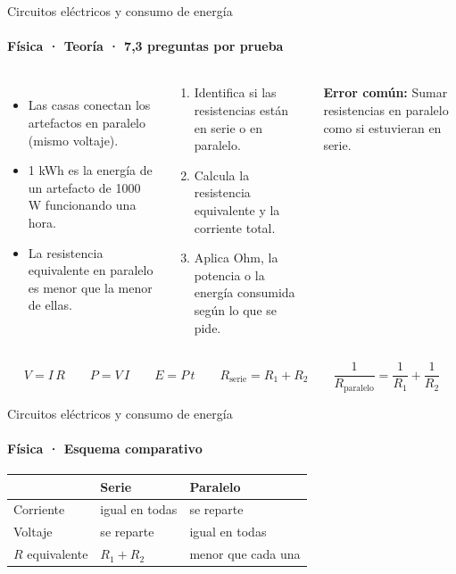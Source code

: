 \documentclass[aspectratio=169,11pt]{beamer}
\newlength{\ajustealto}
\newenvironment{ajustar}[1][0.74\textheight]
  {\setlength{\ajustealto}{#1}\begin{lrbox}{\ajustecaja}\begin{minipage}{\textwidth}}
  {\end{minipage}\end{lrbox}%
   \ifdim\dimexpr\ht\ajustecaja+\dp\ajustecaja\relax>\ajustealto
     \resizebox*{!}{\ajustealto}{\usebox{\ajustecaja}}\else\usebox{\ajustecaja}\fi}
\begin{document}
\begin{frame}{Circuitos eléctricos y consumo de energía}
\label{tema-cs-electricidad}
\framesubtitle{Física · Teoría · 7,3 preguntas por prueba}
\begin{ajustar}
\begin{columns}[T,onlytextwidth]
\begin{itemize}\footnotesize
\item Las casas conectan los artefactos en paralelo (mismo voltaje).
\item 1 kWh es la energía de un artefacto de 1000 W funcionando una hora.
\item La resistencia equivalente en paralelo es menor que la menor de ellas.
\end{itemize}
\begin{cajaregla}\scriptsize \begin{enumerate}\item Identifica si las resistencias están en serie o en paralelo.\item Calcula la resistencia equivalente y la corriente total.\item Aplica Ohm, la potencia o la energía consumida según lo que se pide.\end{enumerate}\end{cajaregla}
\begin{notagris}\scriptsize \textbf{Error común:} Sumar resistencias en paralelo como si estuvieran en serie.\end{notagris}
\end{columns}
\begin{cajaclave}[Fórmulas]\footnotesize
\[V=I\,R \quad\quad P=V\,I \quad\quad E=P\,t \quad\quad R_{\text{serie}}=R_1+R_2 \quad\quad \frac{1}{R_{\text{paralelo}}}=\frac{1}{R_1}+\frac{1}{R_2}\]
\end{cajaclave}
\end{ajustar}
\end{frame}

\begin{frame}{Circuitos eléctricos y consumo de energía}
\framesubtitle{Física · Esquema comparativo}
\begin{center}\footnotesize
\begin{tabular}{@{}>{\raggedright\arraybackslash}p{\dimexpr(\linewidth-4\tabcolsep)/3\relax}>{\raggedright\arraybackslash}p{\dimexpr(\linewidth-4\tabcolsep)/3\relax}>{\raggedright\arraybackslash}p{\dimexpr(\linewidth-4\tabcolsep)/3\relax}@{}}
\toprule
 & \textbf{Serie} & \textbf{Paralelo} \\
\midrule
Corriente & igual en todas & se reparte \\
Voltaje & se reparte & igual en todas \\
$R$ equivalente & $R_1+R_2$ & menor que cada una \\
\bottomrule
\end{tabular}
\end{center}
\end{frame}
\end{document}
